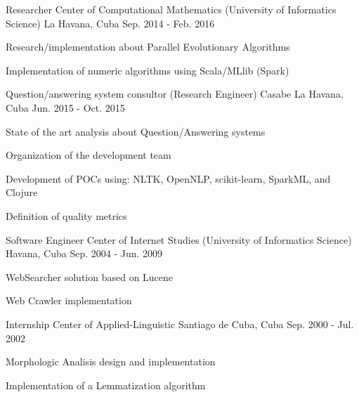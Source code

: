 \begin{cventries}
\cventry
{Researcher} %
{Center of Computational Mathematics (University of Informatics Science)} %
{La Havana, Cuba} %
{Sep. 2014 - Feb. 2016} %
{ %
\begin{cvitems}
\item {Research/implementation about Parallel Evolutionary Algorithms}
\item {Implementation of numeric algorithms using Scala/MLlib (Spark)}
\end{cvitems}
}


\cventry
{Question/answering system consultor (Research Engineer)} %
{Casabe} %
{La Havana, Cuba} %
{Jun. 2015 - Oct. 2015} %
{ %
\begin{cvitems}
\item {State of the art analysis about Question/Answering systems}
\item {Organization of the development team}
\item {Development of POCs using: NLTK, OpenNLP, scikit-learn, SparkML, and Clojure}
\item {Definition of quality metrics}
\end{cvitems}
}


\cventry
{Software Engineer} %
{Center of Internet Studies (University of Informatics Science)} %
{Havana, Cuba} %
{Sep. 2004 - Jun. 2009} %
{ %
\begin{cvitems}
\item {WebSearcher solution based on Lucene}
\item {Web Crawler implementation}
\end{cvitems}
}


\cventry
{Internship} %
{Center of Applied-Linguistic} %
{Santiago de Cuba, Cuba} %
{Sep. 2000 - Jul. 2002} %
{ %
\begin{cvitems}
\item {Morphologic Analisis design and implementation}
\item {Implementation of a Lemmatization algorithm}
\end{cvitems}
}


\end{cventries}
